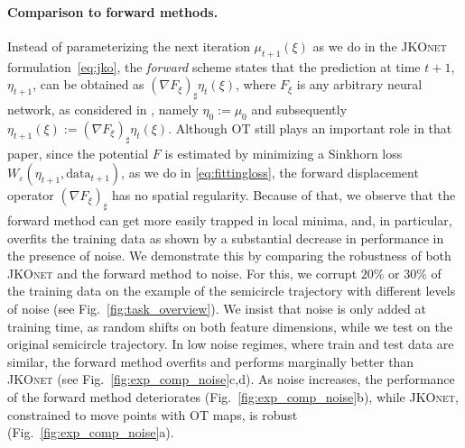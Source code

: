\paragraph{Comparison to forward methods.} \label{sec:eval_comp_fb}
Instead of parameterizing the next iteration $\mu_{t+1}(\xi)$ as we do in the \textsc{JKOnet} formulation~\eqref{eq:jko}, the \emph{forward} scheme states that the prediction at time $t+1$, $\eta_{t+1}$, can be obtained as $(\nabla F_\xi)_{\sharp} \eta_t(\xi)$, where $F_\xi$ is any arbitrary neural network, as considered in \citet{hashimoto2016learning}, namely $\eta_0:=\mu_0$ and subsequently $\eta_{t+1}(\xi):=(\nabla F_\xi)_{\sharp} \eta_t(\xi)$. Although OT still plays an important role in that paper, since the potential $F$ is estimated by minimizing a Sinkhorn loss $W_\varepsilon(\eta_{t+1},\mathrm{data}_{t+1})$, as we do in \eqref{eq:fittingloss}, the forward displacement operator $(\nabla F_\xi)_{\sharp}$ has no spatial regularity. Because of that, we observe that the forward method can get more easily trapped in local minima, and, in particular, overfits the training data as shown by a substantial decrease in performance in the presence of noise.
We demonstrate this by comparing the robustness of both \textsc{JKOnet} and the forward method to noise. For this, we corrupt $20\%$ or $30\%$ of the training data on the example of the semicircle trajectory with different levels of noise (see Fig.~\ref{fig:task_overview}). We insist that noise is only added at training time, as random shifts on both feature dimensions, while we test on the original semicircle trajectory.
In low noise regimes, where train and test data are similar, the forward method overfits and performs marginally better than \textsc{JKOnet} (see Fig.~\ref{fig:exp_comp_noise}c,d). As noise increases, the performance of the forward method deteriorates (Fig.~\ref{fig:exp_comp_noise}b), while \textsc{JKOnet}, constrained to move points with OT maps, is robust (Fig.~\ref{fig:exp_comp_noise}a).%


